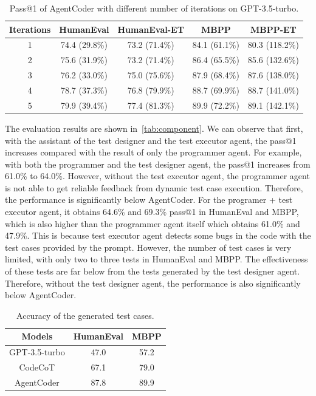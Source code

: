 \documentclass[manuscript,screen,review]{acmart}
\newcommand{\xxx}{AgentCoder\xspace}
\begin{document}
\begin{table}
    \centering
    \caption{Pass@1 of \xxx with different number of iterations on GPT-3.5-turbo.}
    \begin{tabular}{c|cccc}
    \toprule
    Iterations&HumanEval&HumanEval-ET&MBPP&MBPP-ET\\
    \midrule
1& 74.4 (29.8\%)&73.2 (71.4\%)&84.1 (61.1\%)&80.3 (118.2\%)\\
2& 75.6 (31.9\%)&73.2 (71.4\%)&86.4 (65.5\%)&85.6 (132.6\%)\\
3& 76.2 (33.0\%)&75.0 (75.6\%)&87.9 (68.4\%)&87.6 (138.0\%)\\
4& 78.7 (37.3\%)&76.8 (79.9\%)&88.7 (69.9\%)&88.7 (141.0\%)\\
5& 79.9 (39.4\%)&77.4 (81.3\%)&89.9 (72.2\%)&89.1 (142.1\%)\\
         \bottomrule
    \end{tabular}
    \label{tab:steps}
\end{table}


The evaluation results are shown in~\cref{tab:component}. We can observe that first, with the assistant of the test designer and the test executor agent, the pass@1 increases compared with the result of only the programmer agent. For example, with both the programmer and the test designer agent, the pass@1 increases from 61.0\% to 64.0\%. However, without the test executor agent, the programmer agent is not able to get reliable feedback from dynamic test case execution. Therefore, the performance is significantly below \xxx. 
For the programer + test executor agent, it obtains 64.6\% and 69.3\% pass@1 in HumanEval and MBPP, which is also higher than the programmer agent itself which obtains 61.0\% and 47.9\%. This is because test executor agent detects some bugs in the code with the test cases provided by the prompt.
However, the number of test cases is very limited, with only two to three tests in HumanEval and MBPP.
The effectiveness of these tests are far below from the tests generated by the test designer agent.
Therefore, without the test designer agent, the performance is also significantly below \xxx.


\begin{table}
    \centering
    \caption{Accuracy of the generated test cases.}
    \begin{tabular}{c|cc}
    \toprule
    Models&HumanEval&MBPP\\
    \midrule
        GPT-3.5-turbo&47.0&57.2\\
        CodeCoT&67.1&79.0\\
         \xxx &87.8&89.9\\
         \bottomrule
    \end{tabular}
    \label{tab:testcase}
\end{table}
\end{document}
